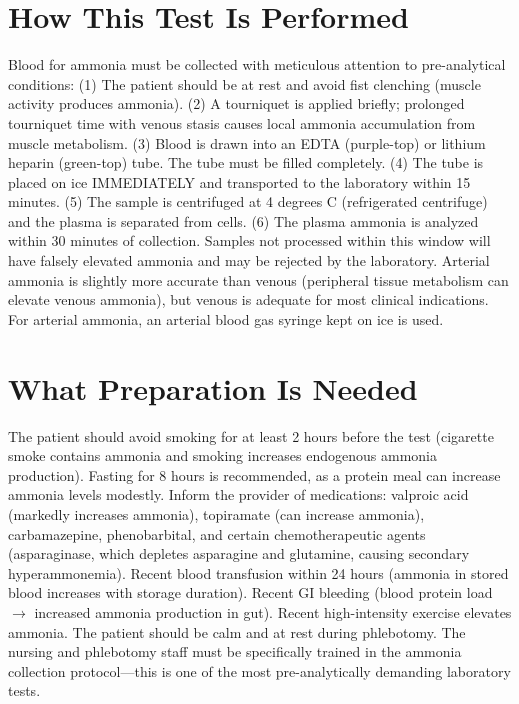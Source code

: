\section*{How This Test Is Performed}
Blood for ammonia must be collected with meticulous attention to pre-analytical conditions: (1) The patient should be at rest and avoid fist clenching (muscle activity produces ammonia). (2) A tourniquet is applied briefly; prolonged tourniquet time with venous stasis causes local ammonia accumulation from muscle metabolism. (3) Blood is drawn into an EDTA (purple-top) or lithium heparin (green-top) tube. The tube must be filled completely. (4) The tube is placed on ice IMMEDIATELY and transported to the laboratory within 15 minutes. (5) The sample is centrifuged at 4 degrees C (refrigerated centrifuge) and the plasma is separated from cells. (6) The plasma ammonia is analyzed within 30 minutes of collection. Samples not processed within this window will have falsely elevated ammonia and may be rejected by the laboratory. Arterial ammonia is slightly more accurate than venous (peripheral tissue metabolism can elevate venous ammonia), but venous is adequate for most clinical indications. For arterial ammonia, an arterial blood gas syringe kept on ice is used.

\section*{What Preparation Is Needed}
The patient should avoid smoking for at least 2 hours before the test (cigarette smoke contains ammonia and smoking increases endogenous ammonia production). Fasting for 8 hours is recommended, as a protein meal can increase ammonia levels modestly. Inform the provider of medications: valproic acid (markedly increases ammonia), topiramate (can increase ammonia), carbamazepine, phenobarbital, and certain chemotherapeutic agents (asparaginase, which depletes asparagine and glutamine, causing secondary hyperammonemia). Recent blood transfusion within 24 hours (ammonia in stored blood increases with storage duration). Recent GI bleeding (blood protein load $\rightarrow$ increased ammonia production in gut). Recent high-intensity exercise elevates ammonia. The patient should be calm and at rest during phlebotomy. The nursing and phlebotomy staff must be specifically trained in the ammonia collection protocol---this is one of the most pre-analytically demanding laboratory tests.

